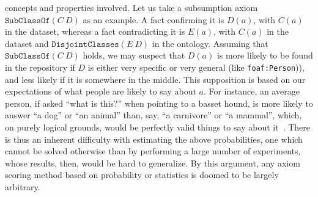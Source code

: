 \documentclass[conference]{IEEEtran}
\begin{document}
concepts and properties involved. Let us take a subsumption axiom $\mathtt{SubClassOf}(C\ D)$
as an example. A fact confirming it is $D(a)$, with $C(a)$ in the dataset,
whereas a fact contradicting it is $E(a)$, with $C(a)$ in the dataset
and $\mathtt{DisjointClasses}(E\ D)$ in the ontology.
Assuming that $\mathtt{SubClassOf}(C\ D)$ holds, we may suspect that
$D(a)$ is more likely to be found in the repository
if $D$ is either very specific or very general (like
 \texttt{foaf:Person})), and less likely if it is somewhere in the middle.
This supposition is based on our expectations of what people are likely to say
about $a$. For instance, an average person, if asked ``what is this?'' when pointing
to a basset hound, is more likely to answer ``a dog'' or ``an animal'' than,
say, ``a carnivore'' or ``a mammal'', which, on purely logical grounds,
would be perfectly valid things to say about it~\cite{Lakoff1987}.
There is thus an inherent difficulty with estimating the above probabilities,
one which cannot be solved otherwise than by performing a large number of
experiments, whose results, then, would be hard to generalize.
By this argument, any axiom scoring method based on probability or statistics is doomed
to be largely arbitrary.



%
\end{document}
